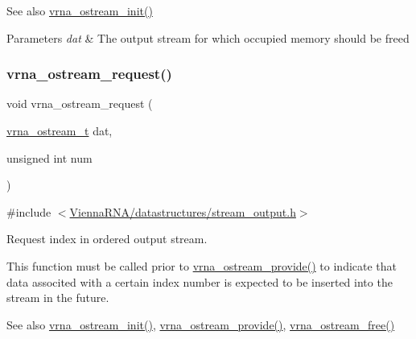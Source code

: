 \begin{DoxySeeAlso}{See also}
\hyperlink{group__buffer__utils_gad23113e66a0910ec2341856e2da56bf6}{vrna\+\_\+ostream\+\_\+init()}
\end{DoxySeeAlso}

\begin{DoxyParams}{Parameters}
{\em dat} & The output stream for which occupied memory should be free\textquotesingle{}d \\
\hline
\end{DoxyParams}
\mbox{\label{group__buffer__utils_gaebca91932705d71bcbf00bd8d82bd7c8}} 
\subsubsection{\texorpdfstring{vrna\+\_\+ostream\+\_\+request()}{vrna\_ostream\_request()}}
{\footnotesize\ttfamily void vrna\+\_\+ostream\+\_\+request (\begin{DoxyParamCaption}\item[{\hyperlink{group__buffer__utils_ga8da189552af21ab6e4e88bdcc240870c}{vrna\+\_\+ostream\+\_\+t}}]{dat,  }\item[{unsigned int}]{num }\end{DoxyParamCaption})}



{\ttfamily \#include $<$\hyperlink{datastructures_2stream__output_8h}{Vienna\+R\+N\+A/datastructures/stream\+\_\+output.\+h}$>$}



Request index in ordered output stream. 

This function must be called prior to \hyperlink{group__buffer__utils_ga6253c42abdeaf3b41a38204865e1f0f7}{vrna\+\_\+ostream\+\_\+provide()} to indicate that data associted with a certain index number is expected to be inserted into the stream in the future.

\begin{DoxySeeAlso}{See also}
\hyperlink{group__buffer__utils_gad23113e66a0910ec2341856e2da56bf6}{vrna\+\_\+ostream\+\_\+init()}, \hyperlink{group__buffer__utils_ga6253c42abdeaf3b41a38204865e1f0f7}{vrna\+\_\+ostream\+\_\+provide()}, \hyperlink{group__buffer__utils_gaf813ec90e1446ba82c89f9a39688a3b3}{vrna\+\_\+ostream\+\_\+free()}
\end{DoxySeeAlso}

